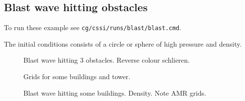 \subsection{Blast wave hitting obstacles}\label{sec:blastObstacles}

To run these example see {\tt cg/cssi/runs/blast/blast.cmd}.

The initial conditions consists of a circle or sphere of high pressure and density.

{
\begin{figure}[htb]
\begin{center}
\end{center}
  \caption{Blast wave hitting 3 obstacles. Reverse colour schlieren.}
  \label{fig:blastShapes}
\end{figure}
}

{
\begin{figure}[htb]
\begin{center}
\end{center}
  \caption{Grids for some buildings and tower.}
  \label{fig:eightBuildings}
\end{figure}
}

{
\begin{figure}[htb]
\begin{center}
\end{center}
  \caption{Blast wave hitting some buildings. Density. Note AMR grids.
  }
  \label{fig:blastBuildings}
\end{figure}
}

